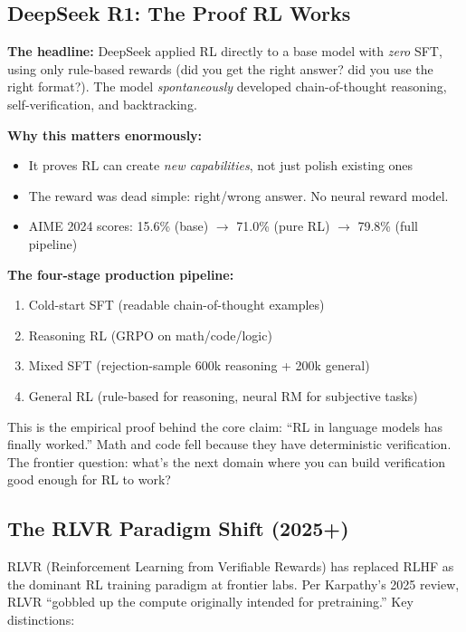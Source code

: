\subsection{DeepSeek R1: The Proof RL Works}

\textbf{The headline:} DeepSeek applied RL directly to a base model with \textit{zero} SFT, using only rule-based rewards (did you get the right answer? did you use the right format?). The model \textit{spontaneously} developed chain-of-thought reasoning, self-verification, and backtracking.

\textbf{Why this matters enormously:}
\begin{itemize}
  \item It proves RL can create \textit{new capabilities}, not just polish existing ones
  \item The reward was dead simple: right/wrong answer. No neural reward model.
  \item AIME 2024 scores: 15.6\% (base) $\to$ 71.0\% (pure RL) $\to$ 79.8\% (full pipeline)
\end{itemize}

\textbf{The four-stage production pipeline:}
\begin{enumerate}
  \item Cold-start SFT (readable chain-of-thought examples)
  \item Reasoning RL (GRPO on math/code/logic)
  \item Mixed SFT (rejection-sample 600k reasoning + 200k general)
  \item General RL (rule-based for reasoning, neural RM for subjective tasks)
\end{enumerate}

\begin{whyanthro}
This is the empirical proof behind the core claim: ``RL in language models has finally worked.'' Math and code fell because they have deterministic verification. The frontier question: what's the next domain where you can build verification good enough for RL to work?
\end{whyanthro}

\subsection{The RLVR Paradigm Shift (2025+)}

RLVR (Reinforcement Learning from Verifiable Rewards) has replaced RLHF as the dominant RL training paradigm at frontier labs. Per Karpathy's 2025 review, RLVR ``gobbled up the compute originally intended for pretraining.'' Key distinctions:

